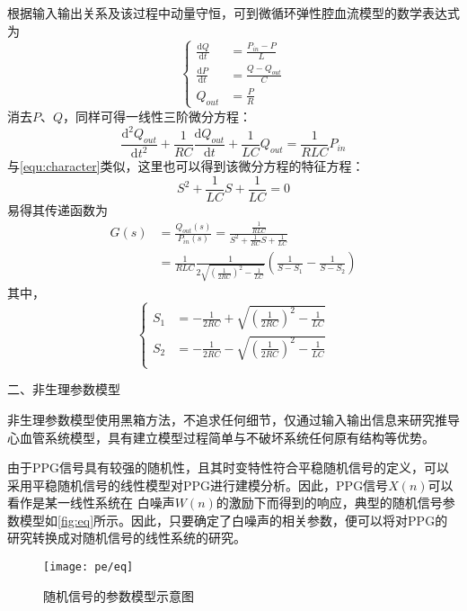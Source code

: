 根据输入输出关系及该过程中动量守恒，可到微循环弹性腔血流模型的数学表达式为
\begin{equation}
    \label{equ:wxh1}
    \left \{
    \begin{aligned}
        \frac{\mathrm{d} Q}{\mathrm{d} t} &=\frac{P_{in}-P}{L}\\
        \frac{\mathrm{d} P}{\mathrm{d} t} &=\frac{Q-Q_{out}}{C}\\
        Q_{out} &=\frac{P}{R}
    \end{aligned}
    \right.
\end{equation}
消去$P$、$Q$，同样可得一线性三阶微分方程：
\begin{equation}
    \label{equ:wxh2}
    \frac{\mathrm{d^2} Q_{out}}{\mathrm{d} t^2}+\frac{1}{RC}\frac{\mathrm{d} Q_{out}}{\mathrm{d} t}+\frac{1}{LC}Q_{out}=\frac{1}{RLC}P_{in}
\end{equation}
与\autoref{equ:character}类似，这里也可以得到该微分方程的特征方程：
\begin{equation}
    \label{equ:character2}
    S^2+\frac{1}{LC}S+\frac{1}{LC}=0
\end{equation}
易得其传递函数为
\begin{equation}
    \label{equ:hs}
    \begin{aligned}
    G(s) &=\frac{Q_{out}(s)}{P_{in}(s)}=\frac{\frac{1}{RLC}}{S^2+\frac{1}{RC}S+\frac{1}{LC}} \\
    &=\frac{1}{RLC}\frac{1}{2\sqrt{(\frac{1}{2RC})^2-\frac{1}{LC}}}(\frac{1}{S-S_{1}}-\frac{1}{S-S_{2}})
    \end{aligned}
\end{equation}
其中，
\begin{equation}
    \label{equ:ss}
    \left \{
    \begin{aligned}
        S_{1} &= -\frac{1}{2RC}+\sqrt{(\frac{1}{2RC})^2-\frac{1}{LC}}\\
        S_{2} &= -\frac{1}{2RC}-\sqrt{(\frac{1}{2RC})^2-\frac{1}{LC}}\\
    \end{aligned}
    \right.
\end{equation}

二、非生理参数模型

非生理参数模型使用黑箱方法，不追求任何细节，仅通过输入输出信息来研究推导心血管系统模型，具有建立模型过程简单与不破坏系统任何原有结构等优势。

由于PPG信号具有较强的随机性，且其时变特性符合平稳随机信号的定义，可以采用平稳随机信号的线性模型对PPG进行建模分析\cite{Qiu2012,PPGYY}。因此，PPG信号$X(n)$可以看作是某一线性系统在
白噪声$W(n)$的激励下而得到的响应，典型的随机信号参数模型如\autoref{fig:eq}所示。因此，只要确定了白噪声的相关参数，便可以将对PPG的研究转换成对随机信号的线性系统的研究。
\begin{figure}[htbp]
    \centering
    \texttt{[image: pe/eq]}
    \caption{\label{fig:eq}随机信号的参数模型示意图}
\end{figure}

